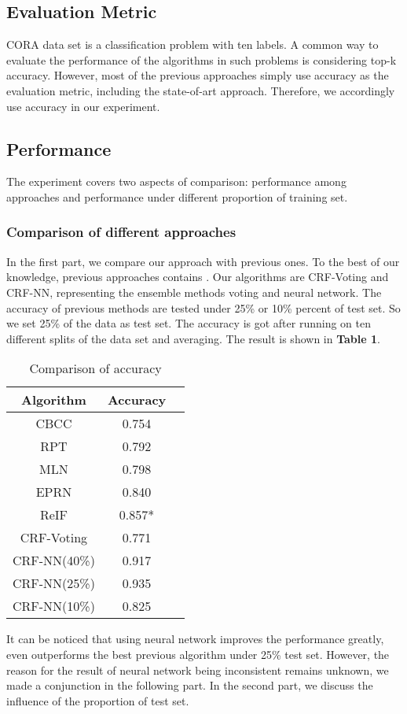 \documentclass{sig-alternate}
\begin{document}
\subsection{Evaluation Metric}
CORA data set is a classification problem with ten labels. A common way to evaluate the performance of the algorithms in such problems is considering top-k accuracy. However, most of the previous approaches simply use accuracy as the evaluation metric, including the state-of-art approach. Therefore, we accordingly use accuracy in our experiment.

\subsection{Performance}
The experiment covers two aspects of comparison: performance among approaches and performance under different proportion of training set.

\subsubsection{Comparison of different approaches}
In the first part, we compare our approach with previous ones. To the best of our knowledge, previous approaches contains \cite{mcdowell2007case}\cite{dinh2012link}\cite{neville2003collective}\cite{crane2012investigating}\cite{preisach2006relational}. Our algorithms are CRF-Voting and CRF-NN, representing the ensemble methods voting and neural network. The accuracy of previous methods are tested under 25\% or 10\% percent of test set. So we set 25\% of the data as test set. The accuracy is got after running on ten different splits of the data set and averaging. The result is shown in \textbf{Table 1}.
\begin{table}
\centering
\caption{Comparison of accuracy}
\begin{tabular}{|c|c|l|} \hline
Algorithm&Accuracy\\ \hline
CBCC\cite{mcdowell2007case} & 0.754\\ \hline
RPT\cite{neville2003collective} & 0.792\\ \hline
MLN\cite{crane2012investigating} & 0.798\\ \hline
EPRN\cite{preisach2006relational} & 0.840\\ \hline
ReIF\cite{dinh2012link} & 0.857* \\ \hline
CRF-Voting & 0.771 \\ \hline
CRF-NN(40\%) & 0.917 \\ \hline
CRF-NN(25\%) & 0.935 \\ \hline
CRF-NN(10\%) & 0.825 \\ \hline
\hline\end{tabular}
\end{table}
It can be noticed that using neural network improves the performance greatly, even outperforms the best previous algorithm under 25\% test set. However, the reason for the result of neural network being inconsistent remains unknown, we made a conjunction in the following part.
In the second part, we discuss the influence of the proportion of test set.
\end{document}
